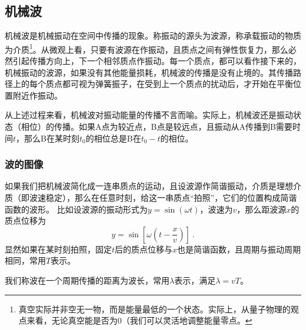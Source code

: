 
\subsection{机械波}
机械波是机械振动在空间中传播的现象。称振动的源头为波源，称承载振动的物质为介质\footnote{真空实际并非空无一物，而是能量最低的一个状态。实际上，从量子物理的观点来看，无论真空能是否为0（我们可以灵活地调整能量零点。}。从微观上看，只要有波源在作振动，且质点之间有弹性恢复力，那么必然引起传播方向上，下一个相邻质点作振动。每一个质点，都可以看作接下来的，机械振动的波源，如果没有其他能量损耗，机械波的传播是没有止境的。其传播路径上的每个质点都可视为弹簧振子，在受到上一个质点的扰动后，才开始在平衡位置附近作振动。

从上述过程来看，机械波对振动能量的传播不言而喻。实际上，机械波还是振动状态（相位）的传播。如果A点为较近点，B点是较远点，且振动从A传播到B需要时间$t$，那么B在某时刻$t_0$的相位总是B在$t_0-t$的相位。
\subsubsection{波的图像}
如果我们把机械波简化成一连串质点的运动，且设波源作简谐振动，介质是理想介质（即波速稳定），那么在任意时刻，给这一串质点“拍照”，它们的位置构成简谐函数的波形。
比如设波源的振动形式为$y=\sin(\omega t)$，波速为$v$，那么距波源$x$的质点位移为
\begin{equation}
y=\sin [\omega (t-\frac{x}{v})]~.
\end{equation}
显然如果在某时刻拍照，固定$t$后的质点位移与$x$也是简谐函数，且周期与振动周期相同，常用$T$表示。

我们称波在一个周期传播的距离为波长，常用$\lambda $表示，满足$\lambda=vT$。